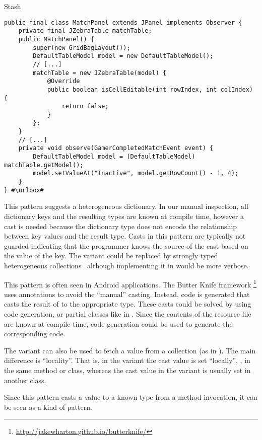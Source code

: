 \begin{pattern}{Stash}
\def\urlvar{http://bit.ly/ggp_org_ggp_base_2SAEXHu}
\begin{verbatim}
public final class MatchPanel extends JPanel implements Observer {
    private final JZebraTable matchTable;
    public MatchPanel() {
        super(new GridBagLayout());
        DefaultTableModel model = new DefaultTableModel();
        // [...]
        matchTable = new JZebraTable(model) {
            @Override
            public boolean isCellEditable(int rowIndex, int colIndex) {
                return false;
            }
        };
    }
    // [...]
    private void observe(GamerCompletedMatchEvent event) {
        DefaultTableModel model = (DefaultTableModel) matchTable.getModel();
        model.setValueAt("Inactive", model.getRowCount() - 1, 4);
    }
} #\urlbox#
\end{verbatim}


\issues{}
This pattern suggests a heterogeneous dictionary.
In our manual inspection,
all dictionary keys and the resulting types are known at compile time,
however a cast is needed because the dictionary type does not encode the
relationship between key values and the result type.
Casts in this pattern are typically not guarded indicating that the programmer knows the source of the cast based on the value of the key.
The  variant could be replaced by 
strongly typed heterogeneous collections~\citep{kiselyovStronglyTypedHeterogeneous2004} although implementing it in \java{} would be more verbose.

This pattern is often seen in Android applications.
The Butter Knife framework%
\footnote{\url{http://jakewharton.github.io/butterknife/}}
uses annotations to avoid the ``manual'' casting.
Instead, code is generated that casts the result of  to the appropriate type.
These casts could be solved by using code generation,
or partial classes like in \csharp{}.
Since the contents of the resource file are known at compile-time,
code generation could be used to generate the corresponding \java{} code.

The  variant can also be used to fetch a value from a collection
(as in ).
The main difference is ``locality''.
That is, in the  variant the cast value is set ``locally'', \ie,
in the same method or class,
whereas the cast value in the  variant is usually set in another class.

Since this pattern casts a value to a known type from a method invocation,
it can be seen as a kind of  pattern.

\end{pattern}
